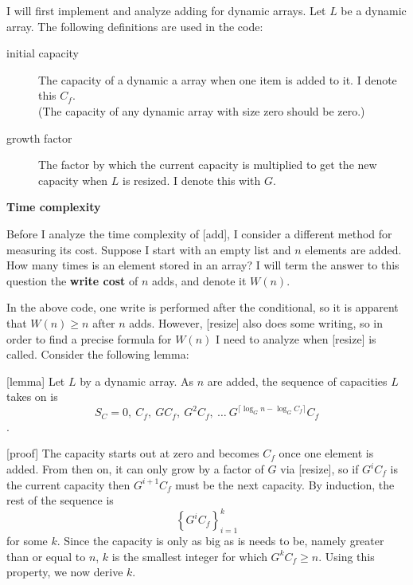 \documentclass{article}
\newcommand{\tcomplex}{\textbf{Time complexity}}
\newcommand{\nwritesfn}{W}
\newcommand{\varnitems}{n}
\newcommand{\listname}{L}
\newcommand{\initcapacity}{C_f}
\newcommand{\growthfactor}{G}
\begin{document}
	I will first implement and analyze adding for dynamic arrays. Let $\listname$ be a dynamic array. The following definitions are used in the code:
	
	\begin{description}
		\item[initial capacity] The capacity of a dynamic a array when one item is added to it. I denote this $\initcapacity$.\\
		(The capacity of any dynamic array with size zero should be zero.)
		\item[growth factor] The factor by which the current capacity is multiplied to get the new capacity when $\listname$ is resized. I denote this with $\growthfactor$.
	\end{description}
	
	
	\tcomplex
	
	Before I analyze the time complexity of [add], I consider a different method for measuring its cost. Suppose I start with an empty list and $\varnitems$ elements are added. How many times is an element stored in an array? I will term the answer to this question the \textbf{write cost} of $\varnitems$ adds, and denote it $\nwritesfn(n)$.
	
	In the above code, one write is performed after the conditional, so it is apparent that $\nwritesfn(\varnitems) \geq \varnitems$ after $n$ adds. However, [resize] also does some writing, so in order to find a precise formula for $\nwritesfn(\varnitems)$ I need to analyze when [resize] is called. Consider the following lemma:
	
	[lemma]
	Let $\listname$ by a dynamic array. As $\varnitems$ are added, the sequence of capacities $\listname$ takes on is $$S_C = 0,\ \initcapacity,\ \growthfactor\initcapacity,\ \growthfactor^2\initcapacity,\ \ldots\ \growthfactor^{\lceil \log_{\growthfactor} \varnitems - \log_{\growthfactor} \initcapacity \rceil}\initcapacity$$.
	
	[proof]
	The capacity starts out at zero and becomes $\initcapacity$ once one element is added. From then on, it can only grow by a factor of $\growthfactor$ via [resize], so if $\growthfactor^i\initcapacity$ is the current capacity then $\growthfactor^{i + 1}\initcapacity$ must be the next capacity. By induction, the rest of the sequence is $$\left\{ \growthfactor^i\initcapacity \right\}_{i = 1}^k$$ for some $k$. Since the capacity is only as big as is needs to be, namely greater than or equal to $\varnitems$, $k$ is the smallest integer for which $\growthfactor^k\initcapacity \geq \varnitems$. Using this property, we now derive $k$.
	
\end{document}
